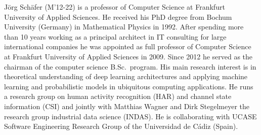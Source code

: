 \documentclass{ieeeaccess}
\begin{document}
\begin{IEEEbiography}{Jörg Schäfer} (M’12-22) is a professor of Computer Science at Frankfurt University of Applied Sciences. He received his PhD degree from Bochum University (Germany) in Mathematical Physics in 1992. After spending more than 10 years working as a principal architect in IT consulting for large international companies he was  appointed as full professor of Computer Science at Frankfurt University of Applied Sciences in 2009. Since 2012 he served as the chairman of the computer science B.Sc.\ program. 
His  main research interest is in theoretical understanding of deep learning architectures and applying machine learning and probabilistic models in ubiquitous computing applications. He runs a research group on human activity recognition (HAR) and channel state information (CSI) and jointly with Matthias Wagner and Dirk Stegelmeyer the research group industrial data science (INDAS). He is collaborating with UCASE Software Engineering Research Group of the Universidad de Cádiz (Spain). 
\end{IEEEbiography}
\end{document}

